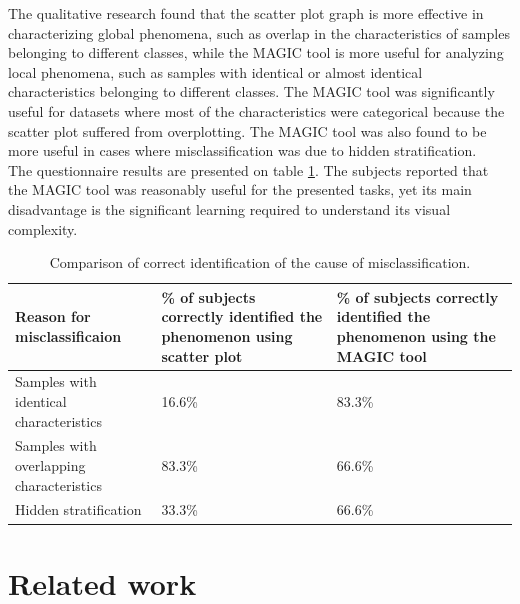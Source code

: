 \documentclass[11pt]{article}
\begin{document}
The qualitative research found that the scatter plot graph is more effective in characterizing global phenomena, such as overlap in the characteristics of samples belonging to different classes, while the MAGIC tool is more useful for analyzing local phenomena, such as samples with identical or almost identical characteristics belonging to different classes. The MAGIC tool was significantly useful for datasets where most of the characteristics were categorical because the scatter plot suffered from overplotting. The MAGIC tool was also found to be more useful in cases where misclassification was due to hidden stratification.
\\The questionnaire results are presented on table \ref{table:tab2}. The subjects reported that the MAGIC tool was reasonably useful for the presented tasks, yet its main disadvantage is the significant learning required to understand its visual complexity.
\begin{table}[h]
\centering
\begin{tabular}{ |m{3.7cm}||m{5.9cm}|m{6.5cm}| } 
\hline
Reason for misclassificaion & \% of subjects correctly identified the phenomenon using scatter plot & \% of subjects correctly identified the phenomenon using the MAGIC tool \\
\hline
\hline
Samples with identical characteristics & 16.6\% & 83.3\% \\
\hline
Samples with overlapping characteristics & 83.3\% & 66.6\% \\
\hline
Hidden stratification & 33.3\% & 66.6\% \\
\hline
\end{tabular}
\caption{Comparison of correct identification of the cause of misclassification.}
\label{table:tab2}
\end{table}
\section{Related work}\label{Related work}
\end{document}
